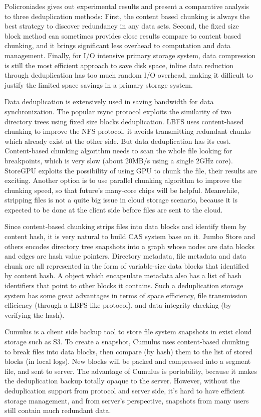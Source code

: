 Policroniades\cite{poli04} gives out
experimental results and present a comparative analysis
to three deduplication methods: First, the content based chunking
is always the best strategy to discover redundancy in any data sets.
Second, the fixed size block method can sometimes provides
close results compare to content based chunking, and it brings significant less
overhead to computation and data management. Finally, for I/O intensive primary storage system,
data compression is still the most efficient approach to save disk space,
inline data reduction through deduplication has too much random I/O overhead, making it difficult to
justify the limited space savings in a primary storage system.

Data deduplication is extensively used in saving bandwidth for data synchronization.
The popular rsync\cite{rsync} protocol exploits the similarity of two directory trees
using fixed size blocks deduplication.
LBFS uses content-based chunking to improve the NFS protocol,
it avoids transmitting redundant chunks which already exist at the other side.
But data deduplication has its cost. Content-based chunking algorithm needs to
scan the whole file looking for breakpoints, which is very slow (about 20MB/s using a single 2GHz core). 
StoreGPU\cite{storegpu08}
exploits the possibility of using GPU to chunk the file,
their results are exciting. Another option is to use parallel
chunking algorithm to improve the chunking speed,
so that future's many-core chips will be helpful. 
Meanwhile, stripping files is not a quite big issue in cloud storage scenario,
because it is expected to be done at the client side before files are
sent to the cloud.

Since content-based chunking strips files into data blocks 
and identify them by content hash,
it is very natural to build CAS system base on it.
Jumbo Store and others\cite{jumbo07,efficient_dedup05,you06} encodes directory tree snapshots
into a graph whose nodes are data blocks and edges
are hash value pointers.
Directory metadata, file metadata and data chunk are all
represented in the form of variable-size data blocks that identified by content hash.
A object which encapsulate metadata also has a list of hash identifiers 
that point to other blocks it contains.
Such a deduplication storage system has some great advantages
in terms of space efficiency, file transmission efficiency (through a LBFS-like protocol), 
and data integrity checking (by verifying the hash).

Cumulus\cite{cumulus09} is a client side backup tool to store 
file system snapshots in exist cloud storage such as S3.
To create a snapshot, Cumulus uses content-based chunking to break files into data blocks,
then compare (by hash) them to the list of stored blocks (in local logs).
New blocks will be packed and compressed into a segment file, and sent to server.
The advantage of Cumulus is portability, because it makes 
the deduplication backup totally opaque to the server.
However, without the deduplication support from protocol and server side,
it's hard to have efficient storage management, and from server's perspective,
snapshots from many users still contain much redundant data.

